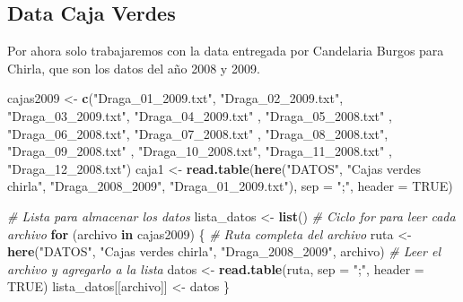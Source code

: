 \documentclass[
]{article}
\newenvironment{Shaded}{\begin{snugshade}}{\end{snugshade}}
\newcommand{\AttributeTok}[1]{\textcolor[rgb]{0.13,0.29,0.53}{#1}}
\newcommand{\CommentTok}[1]{\textcolor[rgb]{0.56,0.35,0.01}{\textit{#1}}}
\newcommand{\ConstantTok}[1]{\textcolor[rgb]{0.56,0.35,0.01}{#1}}
\newcommand{\ControlFlowTok}[1]{\textcolor[rgb]{0.13,0.29,0.53}{\textbf{#1}}}
\newcommand{\FunctionTok}[1]{\textcolor[rgb]{0.13,0.29,0.53}{\textbf{#1}}}
\newcommand{\NormalTok}[1]{#1}
\newcommand{\OtherTok}[1]{\textcolor[rgb]{0.56,0.35,0.01}{#1}}
\newcommand{\StringTok}[1]{\textcolor[rgb]{0.31,0.60,0.02}{#1}}
\begin{document}
\hypertarget{data-caja-verdes}{%
\subsection{Data Caja Verdes}\label{data-caja-verdes}}

Por ahora solo trabajaremos con la data entregada por Candelaria Burgos para Chirla, que son los datos del año 2008 y 2009.

\begin{Shaded}
\begin{Highlighting}[]
\NormalTok{cajas2009 }\OtherTok{\textless{}{-}} \FunctionTok{c}\NormalTok{(}\StringTok{"Draga\_01\_2009.txt"}\NormalTok{,}
           \StringTok{"Draga\_02\_2009.txt"}\NormalTok{,}
           \StringTok{"Draga\_03\_2009.txt"}\NormalTok{, }
           \StringTok{"Draga\_04\_2009.txt"}\NormalTok{ ,}
           \StringTok{"Draga\_05\_2008.txt"}\NormalTok{ ,}
           \StringTok{"Draga\_06\_2008.txt"}\NormalTok{,}
           \StringTok{"Draga\_07\_2008.txt"}\NormalTok{ ,}
           \StringTok{"Draga\_08\_2008.txt"}\NormalTok{,}
           \StringTok{"Draga\_09\_2008.txt"}\NormalTok{ ,}
           \StringTok{"Draga\_10\_2008.txt"}\NormalTok{,}
           \StringTok{"Draga\_11\_2008.txt"}\NormalTok{ ,}
           \StringTok{"Draga\_12\_2008.txt"}\NormalTok{)}
\NormalTok{caja1 }\OtherTok{\textless{}{-}} \FunctionTok{read.table}\NormalTok{(}\FunctionTok{here}\NormalTok{(}\StringTok{"DATOS"}\NormalTok{,}
                         \StringTok{"Cajas verdes chirla"}\NormalTok{,}
                         \StringTok{"Draga\_2008\_2009"}\NormalTok{,}
                         \StringTok{"Draga\_01\_2009.txt"}\NormalTok{), }
                     \AttributeTok{sep =} \StringTok{";"}\NormalTok{,}
                    \AttributeTok{header =} \ConstantTok{TRUE}\NormalTok{)}

\CommentTok{\# Lista para almacenar los datos}
\NormalTok{lista\_datos }\OtherTok{\textless{}{-}} \FunctionTok{list}\NormalTok{()}
\CommentTok{\# Ciclo for para leer cada archivo}
\ControlFlowTok{for}\NormalTok{ (archivo }\ControlFlowTok{in}\NormalTok{ cajas2009) \{}
  \CommentTok{\# Ruta completa del archivo}
\NormalTok{  ruta }\OtherTok{\textless{}{-}} \FunctionTok{here}\NormalTok{(}\StringTok{"DATOS"}\NormalTok{, }
               \StringTok{"Cajas verdes chirla"}\NormalTok{,}
               \StringTok{"Draga\_2008\_2009"}\NormalTok{, archivo)}
  \CommentTok{\# Leer el archivo y agregarlo a la lista}
\NormalTok{  datos }\OtherTok{\textless{}{-}} \FunctionTok{read.table}\NormalTok{(ruta, }\AttributeTok{sep =} \StringTok{";"}\NormalTok{, }\AttributeTok{header =} \ConstantTok{TRUE}\NormalTok{)}
\NormalTok{  lista\_datos[[archivo]] }\OtherTok{\textless{}{-}}\NormalTok{ datos}
\NormalTok{\}}
\end{Highlighting}
\end{Shaded}
\end{document}
